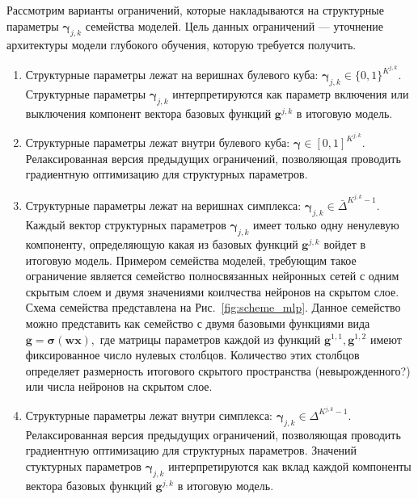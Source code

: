 Рассмотрим варианты ограничений, которые накладываются на структурные параметры $\boldsymbol{\gamma}_{j,k}$ семейства моделей. Цель данных ограничений --- уточнение архитектуры модели глубокого обучения, которую требуется получить. 
\begin{enumerate}
\item Структурные параметры лежат на веришнах булевого куба: $\boldsymbol{\gamma}_{j,k} \in \{0,1\}^{K^{j,k}}$. Структурные параметры  $\boldsymbol{\gamma}_{j,k}$ интерпретируются как параметр включения или выключения компонент вектора базовых функций $\mathbf{g}^{j,k}$ в итоговую модель.
\item Структурные параметры лежат внутри булевого куба: $\boldsymbol{\gamma} \in [0,1]^{K^{j,k}}$. Релаксированная версия предыдущих ограничений, позволяющая проводить градиентную оптимизацию для структурных параметров.
\item Структурные параметры лежат на веришнах симплекса: $\boldsymbol{\gamma}_{j,k} \in \bar{\Delta}^{K^{j,k}-1}$. Каждый вектор структурных параметров $\boldsymbol{\gamma}_{j,k}$ имеет только одну ненулевую компоненту, определяющую какая из базовых функций $\mathbf{g}^{j,k}$ войдет в итоговую модель. Примером семейства моделей, требующим такое ограничение является семейство полносвязанных нейронных сетей с одним скрытым слоем и двумя значениями коилчества нейронов на скрытом слое. Схема семейства представлена на Рис.~\ref{fig:scheme_mlp}. Данное семейство можно представить как семейство с двумя базовыми функциями вида $\mathbf{g} = \boldsymbol{\sigma}(\mathbf{w}\mathbf{x}),$ где матрицы параметров каждой из функций  $\mathbf{g}^{1,1}, \mathbf{g}^{1,2}$ имеют фиксированное число нулевых столбцов. Количество этих столбцов определяет размерность итогового скрытого пространства (невырожденного?) или числа нейронов на скрытом слое.
\item  Структурные параметры лежат внутри симплекса: $\boldsymbol{\gamma}_{j,k} \in {\Delta}^{K^{j,k}-1}$. Релаксированная версия предыдущих ограничений, позволяющая проводить градиентную оптимизацию для структурных параметров. Значений стуктурных параметров $\boldsymbol{\gamma}_{j,k}$ интерпретируются как вклад каждой компоненты вектора базовых функций $\mathbf{g}^{j,k}$ в итоговую модель. 
\end{enumerate}

